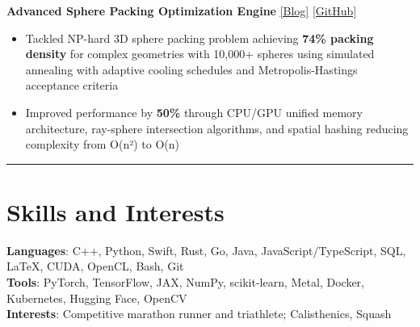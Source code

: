 \documentclass[11pt]{article}
\begin{document}
\vspace{3pt}
\noindent\textbf{Advanced Sphere Packing Optimization Engine} \href{https://dimitrichrysafis.github.io/#post/post8.md}{\underline{[Blog]}} \href{https://github.com/DimitriChrysafis/SpherePacker?tab=readme-ov-file}{\underline{[GitHub]}}
\begin{itemize}[leftmargin=*, topsep=1pt, itemsep=1pt, parsep=0pt]
\item Tackled NP-hard 3D sphere packing problem achieving \textbf{74\% packing density} for complex geometries with 10,000+ spheres using simulated annealing with adaptive cooling schedules and Metropolis-Hastings acceptance criteria
\item Improved performance by \textbf{50\%} through CPU/GPU unified memory architecture, ray-sphere intersection algorithms, and spatial hashing reducing complexity from O(n²) to O(n)
\end{itemize}

\noindent\rule{\textwidth}{0.5pt}

\section*{\textcolor{modernblue}{\Large Skills and Interests}}
\textbf{Languages}: C++, Python, Swift, Rust, Go, Java, JavaScript/TypeScript, SQL, LaTeX, CUDA, OpenCL, Bash, Git\\
\textbf{Tools}: PyTorch, TensorFlow, JAX, NumPy, scikit-learn, Metal, Docker, Kubernetes, Hugging Face, OpenCV\\
\textbf{Interests}: Competitive marathon runner and triathlete; Calisthenics, Squash
\end{document}
